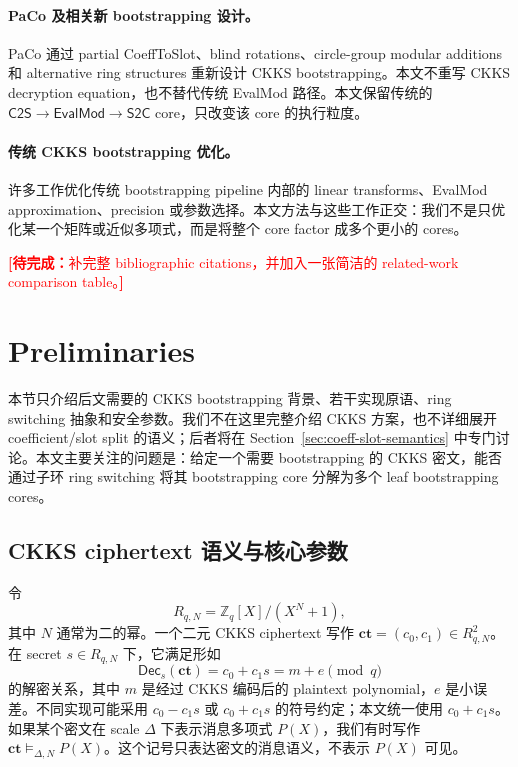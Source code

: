 \documentclass[UTF8,11pt]{article}
\newcommand{\todo}[1]{\textcolor{red}{\textbf{[待完成：}#1\textbf{]}}}
\newcommand{\CtwoS}{\mathsf{C2S}}
\newcommand{\StwoC}{\mathsf{S2C}}
\newcommand{\EvalMod}{\mathsf{EvalMod}}
\newcommand{\Dec}{\mathsf{Dec}}
\newcommand{\ct}{\mathbf{ct}}
\theoremstyle{definition}
\theoremstyle{plain}
\begin{document}
\paragraph{PaCo 及相关新 bootstrapping 设计。} PaCo 通过 partial CoeffToSlot、blind rotations、circle-group modular additions 和 alternative ring structures 重新设计 CKKS bootstrapping。本文不重写 CKKS decryption equation，也不替代传统 EvalMod 路径。本文保留传统的 $\CtwoS\to\EvalMod\to\StwoC$ core，只改变该 core 的执行粒度。

\paragraph{传统 CKKS bootstrapping 优化。} 许多工作优化传统 bootstrapping pipeline 内部的 linear transforms、EvalMod approximation、precision 或参数选择。本文方法与这些工作正交：我们不是只优化某一个矩阵或近似多项式，而是将整个 core factor 成多个更小的 cores。

\todo{补完整 bibliographic citations，并加入一张简洁的 related-work comparison table。}
\section{Preliminaries}
\label{sec:preliminaries}

本节只介绍后文需要的 CKKS bootstrapping 背景、若干实现原语、ring switching 抽象和安全参数。我们不在这里完整介绍 CKKS 方案，也不详细展开 coefficient/slot split 的语义；后者将在 Section~\ref{sec:coeff-slot-semantics} 中专门讨论。本文主要关注的问题是：给定一个需要 bootstrapping 的 CKKS 密文，能否通过子环 ring switching 将其 bootstrapping core 分解为多个 leaf bootstrapping cores。

\subsection{CKKS ciphertext 语义与核心参数}
\label{subsec:ckks-ciphertext-params}

令
\[
R_{q,N}=\mathbb Z_q[X]/(X^N+1),
\]
其中 \(N\) 通常为二的幂。一个二元 CKKS ciphertext 写作 \(\ct=(c_0,c_1)\in R_{q,N}^2\)。在 secret \(s\in R_{q,N}\) 下，它满足形如
\[
\Dec_s(\ct)=c_0+c_1s=m+e\pmod q
\]
的解密关系，其中 \(m\) 是经过 CKKS 编码后的 plaintext polynomial，\(e\) 是小误差。不同实现可能采用 \(c_0-c_1s\) 或 \(c_0+c_1s\) 的符号约定；本文统一使用 \(c_0+c_1s\)。如果某个密文在 scale \(\Delta\) 下表示消息多项式 \(P(X)\)，我们有时写作 \(\ct\vDash_{\Delta,N}P(X)\)。这个记号只表达密文的消息语义，不表示 \(P(X)\) 可见。
\end{document}
